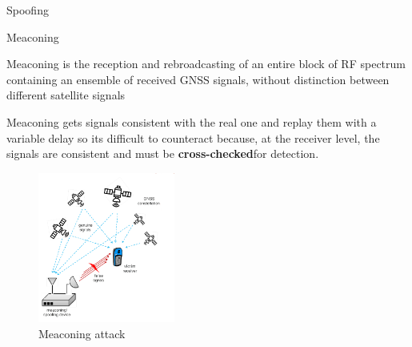 \begin{section}{Spoofing}
      \begin{subsection}{Meaconing}
        \begin{boxH}
          Meaconing is the reception and rebroadcasting of an entire block of RF spectrum 
          containing an ensemble of received GNSS signals, without distinction between different 
          satellite signals
        \end{boxH}
        Meaconing gets signals consistent with the real one and replay them with a variable delay
        so its difficult to counteract because, at the receiver level, the signals are consistent
        and must be \textbf{cross-checked}for detection.
        \begin{figure}[h]
          \centering
          \includegraphics[width=0.4\textwidth]{img/wireless/meaconing.png}
          \caption{Meaconing attack}
          \label{fig:GNSS meaconing}
        \end{figure}

      \end{subsection}
    \end{section}


